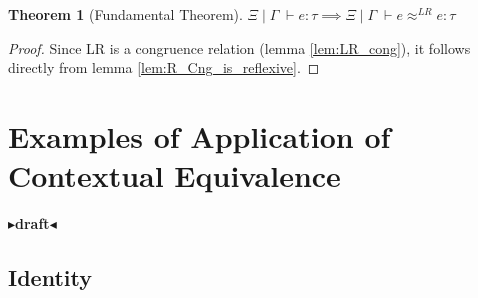 \documentclass[twoside,11pt,openright]{report}
\newtheorem{theorem}{Theorem}
\theoremstyle{definition}
\newcommand{\expr}{e}
\newcommand{\typ}{\tau}
\newcommand{\venv}{\Gamma}
\newcommand{\tenv}{\Xi}
\newcommand{\jdg}[4]{#1 \; | \; #2 \; \vdash #3 : #4}
\newcommand{\jdgRel}[6]{#1 \; | \; #2 \; \vdash #3 \approx^{#4} #5 : #6}
\newcommand{\LogRel}[5]{\jdgRel{#1}{#2}{#3}{LR}{#4}{#5}}
\newcommand{\todo}[1]{{\color[rgb]{.5,0,0}\textbf{$\blacktriangleright$#1$\blacktriangleleft$}}}
\begin{document}
\begin{theorem}[Fundamental Theorem]\label{thm:fund}
  $\jdg{\tenv}{\venv}{\expr}{\typ} \implies \LogRel{\tenv}{\venv}{\expr}{\expr}{\typ}$
\end{theorem}
\begin{proof}
  Since LR is a congruence relation (lemma \ref{lem:LR_cong}), it follows directly from lemma \ref{lem:R_Cng_is_reflexive}.
\end{proof}




\chapter{Examples of Application of Contextual Equivalence}
\label{ch:ACE}

\todo{draft}

\section{Identity}
\end{document}

